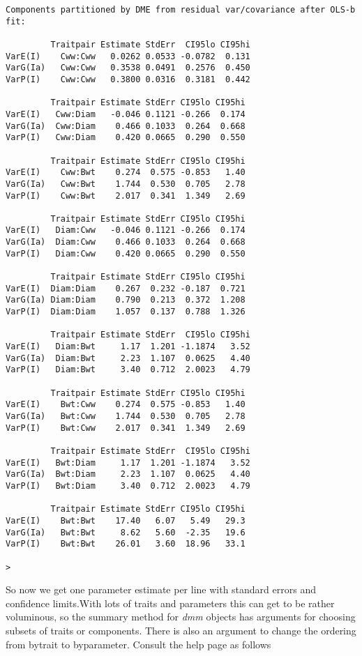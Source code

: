 \documentclass[titlepage]{article}  %
\begin{document}
\begin{verbatim}
Components partitioned by DME from residual var/covariance after OLS-b fit:

         Traitpair Estimate StdErr  CI95lo CI95hi
VarE(I)    Cww:Cww   0.0262 0.0533 -0.0782  0.131
VarG(Ia)   Cww:Cww   0.3538 0.0491  0.2576  0.450
VarP(I)    Cww:Cww   0.3800 0.0316  0.3181  0.442

         Traitpair Estimate StdErr CI95lo CI95hi
VarE(I)   Cww:Diam   -0.046 0.1121 -0.266  0.174
VarG(Ia)  Cww:Diam    0.466 0.1033  0.264  0.668
VarP(I)   Cww:Diam    0.420 0.0665  0.290  0.550

         Traitpair Estimate StdErr CI95lo CI95hi
VarE(I)    Cww:Bwt    0.274  0.575 -0.853   1.40
VarG(Ia)   Cww:Bwt    1.744  0.530  0.705   2.78
VarP(I)    Cww:Bwt    2.017  0.341  1.349   2.69

         Traitpair Estimate StdErr CI95lo CI95hi
VarE(I)   Diam:Cww   -0.046 0.1121 -0.266  0.174
VarG(Ia)  Diam:Cww    0.466 0.1033  0.264  0.668
VarP(I)   Diam:Cww    0.420 0.0665  0.290  0.550

         Traitpair Estimate StdErr CI95lo CI95hi
VarE(I)  Diam:Diam    0.267  0.232 -0.187  0.721
VarG(Ia) Diam:Diam    0.790  0.213  0.372  1.208
VarP(I)  Diam:Diam    1.057  0.137  0.788  1.326

         Traitpair Estimate StdErr  CI95lo CI95hi
VarE(I)   Diam:Bwt     1.17  1.201 -1.1874   3.52
VarG(Ia)  Diam:Bwt     2.23  1.107  0.0625   4.40
VarP(I)   Diam:Bwt     3.40  0.712  2.0023   4.79

         Traitpair Estimate StdErr CI95lo CI95hi
VarE(I)    Bwt:Cww    0.274  0.575 -0.853   1.40
VarG(Ia)   Bwt:Cww    1.744  0.530  0.705   2.78
VarP(I)    Bwt:Cww    2.017  0.341  1.349   2.69

         Traitpair Estimate StdErr  CI95lo CI95hi
VarE(I)   Bwt:Diam     1.17  1.201 -1.1874   3.52
VarG(Ia)  Bwt:Diam     2.23  1.107  0.0625   4.40
VarP(I)   Bwt:Diam     3.40  0.712  2.0023   4.79

         Traitpair Estimate StdErr CI95lo CI95hi
VarE(I)    Bwt:Bwt    17.40   6.07   5.49   29.3
VarG(Ia)   Bwt:Bwt     8.62   5.60  -2.35   19.6
VarP(I)    Bwt:Bwt    26.01   3.60  18.96   33.1

>
\end{verbatim} 

 So now we get one parameter estimate per line with standard errors and confidence limits.With lots of traits and parameters this can get to be rather voluminous, so the summary method for {\em dmm} objects has arguments for choosing subsets of traits or components. There is also an argument to change the ordering from bytrait to byparameter. Consult the help page as follows
\end{document}
